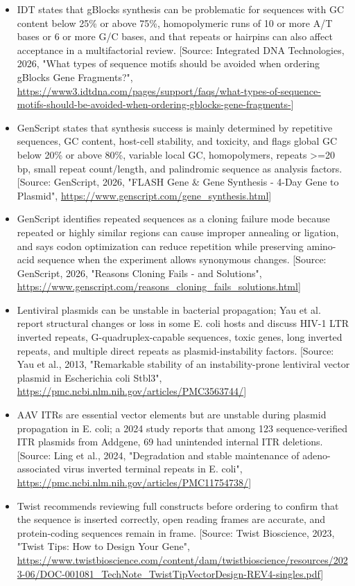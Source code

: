 \documentclass[11pt]{report}
\begin{document}
\begin{itemize}
\item IDT states that gBlocks synthesis can be problematic for sequences with GC content below 25\% or above 75\%, homopolymeric runs of 10 or more A/T bases or 6 or more G/C bases, and that repeats or hairpins can also affect acceptance in a multifactorial review. [Source: Integrated DNA Technologies, 2026, "What types of sequence motifs should be avoided when ordering gBlocks Gene Fragments?", \url{https://www3.idtdna.com/pages/support/faqs/what-types-of-sequence-motifs-should-be-avoided-when-ordering-gblocks-gene-fragments-}]
\item GenScript states that synthesis success is mainly determined by repetitive sequences, GC content, host-cell stability, and toxicity, and flags global GC below 20\% or above 80\%, variable local GC, homopolymers, repeats >=20 bp, small repeat count/length, and palindromic sequence as analysis factors. [Source: GenScript, 2026, "FLASH Gene \& Gene Synthesis - 4-Day Gene to Plasmid", \url{https://www.genscript.com/gene_synthesis.html}]
\item GenScript identifies repeated sequences as a cloning failure mode because repeated or highly similar regions can cause improper annealing or ligation, and says codon optimization can reduce repetition while preserving amino-acid sequence when the experiment allows synonymous changes. [Source: GenScript, 2026, "Reasons Cloning Fails - and Solutions", \url{https://www.genscript.com/reasons_cloning_fails_solutions.html}]
\item Lentiviral plasmids can be unstable in bacterial propagation; Yau et al. report structural changes or loss in some E. coli hosts and discuss HIV-1 LTR inverted repeats, G-quadruplex-capable sequences, toxic genes, long inverted repeats, and multiple direct repeats as plasmid-instability factors. [Source: Yau et al., 2013, "Remarkable stability of an instability-prone lentiviral vector plasmid in Escherichia coli Stbl3", \url{https://pmc.ncbi.nlm.nih.gov/articles/PMC3563744/}]
\item AAV ITRs are essential vector elements but are unstable during plasmid propagation in E. coli; a 2024 study reports that among 123 sequence-verified ITR plasmids from Addgene, 69 had unintended internal ITR deletions. [Source: Ling et al., 2024, "Degradation and stable maintenance of adeno-associated virus inverted terminal repeats in E. coli", \url{https://pmc.ncbi.nlm.nih.gov/articles/PMC11754738/}]
\item Twist recommends reviewing full constructs before ordering to confirm that the sequence is inserted correctly, open reading frames are accurate, and protein-coding sequences remain in frame. [Source: Twist Bioscience, 2023, "Twist Tips: How to Design Your Gene", \url{https://www.twistbioscience.com/content/dam/twistbioscience/resources/2023-06/DOC-001081_TechNote_TwistTipVectorDesign-REV4-singles.pdf}]
\end{itemize}
\end{document}
